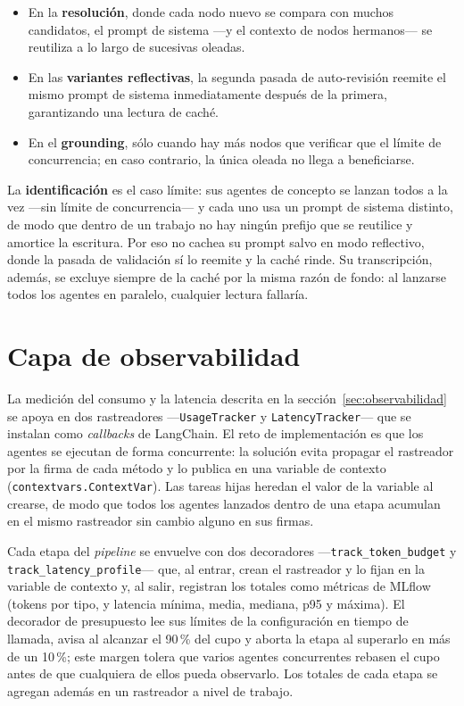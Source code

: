 \begin{itemize}
  \item En la \textbf{resolución}, donde cada nodo nuevo se compara con muchos candidatos, el prompt
        de sistema —y el contexto de nodos hermanos— se reutiliza a lo largo de sucesivas oleadas.
  \item En las \textbf{variantes reflectivas}, la segunda pasada de auto-revisión reemite el mismo
        prompt de sistema inmediatamente después de la primera, garantizando una lectura de caché.
  \item En el \textbf{grounding}, sólo cuando hay más nodos que verificar que el límite de
        concurrencia; en caso contrario, la única oleada no llega a beneficiarse.
\end{itemize}

La \textbf{identificación} es el caso límite: sus agentes de concepto se lanzan todos a la vez —sin
límite de concurrencia— y cada uno usa un prompt de sistema distinto, de modo que dentro de un
trabajo no hay ningún prefijo que se reutilice y amortice la escritura. Por eso no cachea su prompt
salvo en modo reflectivo, donde la pasada de validación sí lo reemite y la caché rinde. Su
transcripción, además, se excluye siempre de la caché por la misma razón de fondo: al lanzarse
todos los agentes en paralelo, cualquier lectura fallaría.

\section{Capa de observabilidad}
\label{anx:observabilidad}

La medición del consumo y la latencia descrita en la sección~\ref{sec:observabilidad} se apoya en
dos rastreadores —\texttt{UsageTracker} y \texttt{LatencyTracker}— que se instalan como
\textit{callbacks} de LangChain. El reto de implementación es que los agentes se ejecutan de forma
concurrente: la solución evita propagar el rastreador por la firma de cada método y lo publica en
una variable de contexto (\texttt{contextvars.ContextVar}). Las tareas hijas heredan el valor de la
variable al crearse, de modo que todos los agentes lanzados dentro de una etapa acumulan en el
mismo rastreador sin cambio alguno en sus firmas.

Cada etapa del \textit{pipeline} se envuelve con dos decoradores —\texttt{track\_token\_budget} y
\texttt{track\_latency\_profile}— que, al entrar, crean el rastreador y lo fijan en la variable de
contexto y, al salir, registran los totales como métricas de MLflow (tokens por tipo, y latencia
mínima, media, mediana, p95 y máxima). El decorador de presupuesto lee sus límites de la
configuración en tiempo de llamada, avisa al alcanzar el 90\,\% del cupo y aborta la etapa al
superarlo en más de un 10\,\%; este margen tolera que varios agentes concurrentes rebasen el cupo
antes de que cualquiera de ellos pueda observarlo. Los totales de cada etapa se agregan además en
un rastreador a nivel de trabajo.

